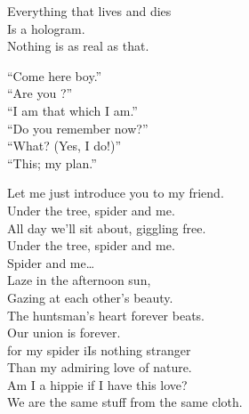 
Everything that lives and dies \\
Is a hologram. \\
Nothing is as real as that. \\


``Come here boy.'' \\
``Are you ?'' \\
``I am that which I am.'' \\

``Do you remember now?'' \\
``What? (Yes, I do!)'' \\
``This; my  plan.'' \\









Let me just introduce you to my friend. \\
Under the tree, spider and me. \\
All day we'll sit about, giggling free. \\
Under the tree, spider and me. \\

Spider and me… \\

Laze in the afternoon sun, \\
Gazing at each other's beauty. \\
The huntsman's heart forever beats. \\
Our union is forever. \\

 for my spider iIs nothing stranger \\
Than my admiring love of nature. \\
Am I a hippie if I have this love? \\
We are the same stuff from the same cloth. \\


